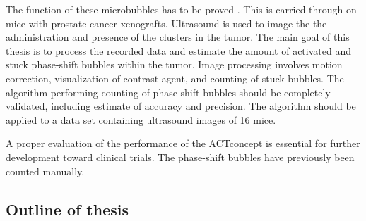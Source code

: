 The function of these microbubbles has to be proved . This is carried through on mice with prostate cancer xenografts. Ultrasound is used to image the the administration and presence of the clusters in the tumor. The main goal of this thesis is to process the recorded data and estimate the amount of activated and stuck phase-shift bubbles within the tumor. Image processing involves motion correction, visualization of contrast agent, and counting of stuck bubbles. The algorithm performing counting of phase-shift bubbles should be completely validated, including estimate of accuracy and precision. The algorithm should be applied to a data set containing ultrasound images of 16 mice. 

A proper evaluation of the performance of the ACT\textregistered concept is essential for further development toward clinical trials.  The phase-shift bubbles have previously been counted manually. 









%
%




\subsection*{Outline of thesis}

 
   